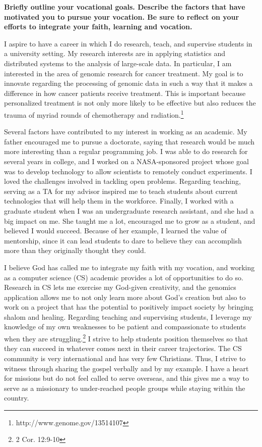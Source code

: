 \documentclass{article}
\begin{document}
\textbf{Briefly outline your vocational goals. Describe the factors that have motivated you to pursue your vocation. Be sure to reflect on your efforts to integrate your faith, learning and vocation.}\\
	
\pagestyle{plain}

I aspire to have a career in which I do research, teach, and supervise students in a university setting.
My research interests are in applying statistics and distributed systems to the analysis of large-scale data.
In particular, I am interested in the area of genomic research for cancer treatment.  My goal is to innovate regarding the processing of genomic data in such a way that it makes a difference in how cancer patients receive treatment.  This is important because personalized treatment is not only more likely to be effective but also reduces the trauma of myriad rounds of chemotherapy and radiation.\footnote{http://www.genome.gov/13514107}

Several factors have contributed to my interest in working as an academic.
My father encouraged me to pursue a doctorate, saying that research would be much more interesting than a regular programming job.
I was able to do research for several years in college, and I worked on a NASA-sponsored project whose goal was to develop technology to allow scientists to remotely conduct experiments.  
I loved the challenges involved in tackling open problems.
Regarding teaching, serving as a TA for my advisor inspired me to teach students about current technologies that will help them in the workforce.
Finally, I worked with a graduate student when I was an undergraduate research assistant, and she had a big impact on me.  
She taught me a lot, encouraged me to grow as a student, and believed I would succeed.
Because of her example, I learned the value of mentorship, since it can lead students to dare to believe they can accomplish more than they originally thought they could.

I believe God has called me to integrate my faith with my vocation, and working as a computer science (CS) academic provides a lot of opportunities to do so.
Research in CS lets me exercise my God-given creativity, and the genomics application allows me to not only learn more about God's creation but also to work on a project that has the potential to positively impact society by bringing shalom and healing.
Regarding teaching and supervising students, I leverage my knowledge of my own weaknesses to be patient and compassionate to students when they are struggling.\footnote{2 Cor. 12:9-10}
I strive to help students position themselves so that they can succeed in whatever comes next in their career trajectories.
The CS community is very international and has very few Christians.
Thus, I strive to witness through sharing the gospel verbally and by my example.
I have a heart for missions but do not feel called to serve overseas, and this gives me a way to serve as a missionary to under-reached people groups while staying within the country.
\end{document}
